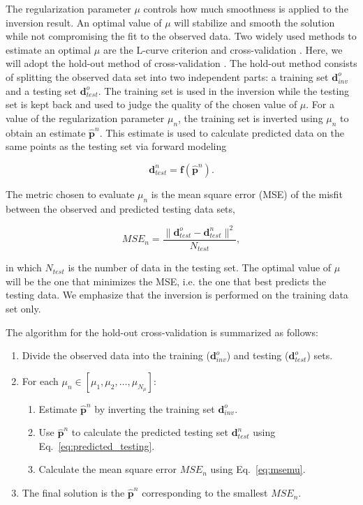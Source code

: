 \documentclass[extra,mreferee]{gji}
\begin{document}
The regularization parameter $\mu$ controls how much smoothness is applied to
the inversion result.
An optimal value of $\mu$ will stabilize and smooth the solution while not
compromising the fit to the observed data.
Two widely used methods to estimate an optimal $\mu$ are
the L-curve criterion and cross-validation \citep{hansen1992}.
Here, we will adopt the hold-out method of cross-validation \citep{kim2009}.
The hold-out method consists of splitting the observed data set into two
independent parts:
a training set $\mathbf{d}^o_{inv}$
and a testing set $\mathbf{d}^o_{test}$.
The training set is used in the inversion
while the testing set is kept back
and used to judge the quality of the chosen value of $\mu$.
For a value of the regularization parameter $\mu_n$,
the training set is inverted using $\mu_n$
to obtain an estimate $\mathbf{\hat{p}}^n$.
This estimate is used to calculate predicted data
on the same points as the testing set
via forward modeling

\begin{equation}
    \mathbf{d}_{test}^n = \mathbf{f}(\mathbf{\hat{p}}^n).
    \label{eq:predicted_testing}
\end{equation}

The metric chosen to evaluate $\mu_n$ is
the mean square error (MSE) of the misfit
between the observed and predicted testing data sets,

\begin{equation}
    MSE_n = \dfrac{\|\mathbf{d}^o_{test} - \mathbf{d}^n_{test}\|^2}{N_{test}},
    \label{eq:msemu}
\end{equation}

\noindent
in which $N_{test}$ is the number of data in the testing set.
The optimal value of $\mu$ will be the one that minimizes the MSE,
i.e. the one that best predicts the testing data.
We emphasize that the inversion is performed on the training data set only.

The algorithm for the hold-out cross-validation is summarized as follows:

\begin{enumerate}
    \item Divide the observed data into
        the training ($\mathbf{d}^o_{inv}$)
        and testing ($\mathbf{d}^o_{test}$) sets.
    \item For each $\mu_n \in [\mu_1, \mu_2, \ldots, \mu_{N_{\mu}}]$:
    \begin{enumerate}
        \item Estimate $\mathbf{\hat{p}}^n$ by inverting the training set
            $\mathbf{d}^o_{inv}$.
        \item Use $\mathbf{\hat{p}}^n$ to calculate the predicted testing set
            $\mathbf{d}^n_{test}$ using Eq.~\ref{eq:predicted_testing}.
        \item Calculate the mean square error $MSE_n$ using Eq.~\ref{eq:msemu}.
    \end{enumerate}
    \item The final solution is the $\mathbf{\hat{p}}^n$ corresponding to the
        smallest $MSE_n$.
\end{enumerate}
\end{document}
